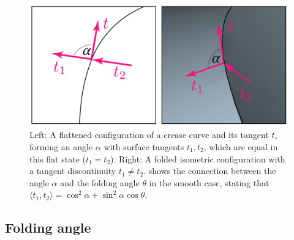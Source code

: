 \begin{figure} [b]
	\centering
	\includegraphics[width=0.7\linewidth]{figures/fold_angles_smooth}
	\caption{Left: A flattened configuration of a crease curve and its tangent $t$, forming an angle $\alpha$ with surface tangents $t_1,t_2$, which are equal in this flat state ($t_1=t_2$). Right: A folded isometric configuration with a tangent discontinuity  $t_1 \neq t_2$.  shows the connection between the angle $\alpha$ and the folding angle $\theta$ in the smooth case, stating that $\langle t_1, t_2 \rangle = \cos^2\!\alpha + \sin^2\!\alpha \cos\theta$.}
	\label{fig:fold_angles_smooth}
\end{figure}

\subsection{Folding angle} \label{sec:folding_angle}

